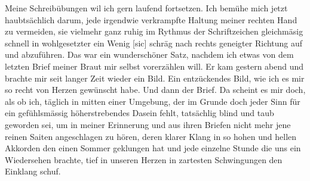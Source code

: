 \def\day{5. Oktober 1942 *}
\mktitle

Meine Schreib\"{u}bungen wil ich gern laufend fortsetzen.
Ich bem\"{u}he mich jetzt haubts\"{a}chlich darum, jede irgendwie verkrampfte Haltung meiner rechten Hand zu vermeiden, sie vielmehr ganz ruhig im Rythmus der Schriftzeichen gleichm\"{a}sig schnell in wohlgesetzter ein Wenig{\color{red} [sic] } schr\"{a}g nach rechts geneigter Richtung auf und abzuf\"{u}hren.
Das war ein wundersch\"{o}ner Satz, nachdem ich etwas von dem letzten Brief meiner Braut mir selbst vorerz\"{a}hlen will.
Er kam gestern abend und brachte mir seit langer Zeit wieder ein Bild.
Ein entz\"{u}ckendes Bild, wie ich es mir so recht von Herzen gew\"{u}nscht habe.
Und dann der Brief.
Da scheint es mir doch, als ob ich, t\"{a}glich in mitten einer Umgebung, der im Grunde doch jeder Sinn f\"{u}r ein gef\"{u}hlsm\"{a}ssig h\"{o}herstrebendes Dasein fehlt, tats\"{a}chlig blind und taub geworden sei, um in meiner Erinnerung und aus ihren Briefen nicht mehr jene reinen Saiten angeschlagen zu h\"{o}ren, deren klarer Klang in so hohen und hellen Akkorden den einen Sommer geklungen hat und jede einzelne Stunde die uns ein Wiedersehen brachte, tief in unseren Herzen in zartesten Schwingungen den Einklang schuf.

\clearpage
